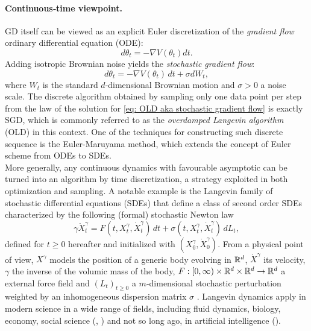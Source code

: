 \documentclass[12pt]{article}
\begin{document}
\paragraph{Continuous‐time viewpoint.}
GD itself can be viewed as an explicit Euler discretization of the \emph{gradient flow} ordinary differential equation (ODE):
\begin{equation*}
d\theta_t=-\nabla V(\theta_t)dt.
\end{equation*}
Adding isotropic Brownian noise yields the \emph{stochastic gradient flow}:
\begin{equation}
\label{eq: OLD aka stochastic gradient flow}
\boxed{
d\theta_t=-\nabla V(\theta_t)\,dt+\sigma dW_t,
}
\end{equation}
where \(W_t\) is the standard \(d\)-dimensional Brownian motion and \(\sigma>0\) a noise scale.
The discrete algorithm obtained by sampling only one data point per step from the law of the solution for \eqref{eq: OLD aka stochastic gradient flow} is exactly SGD, which is commonly referred to as the \textit{overdamped Langevin algorithm} (OLD) in this context.
One of the techniques for constructing such discrete sequence is the Euler-Maruyama method, which extends the concept of Euler scheme from ODEs to SDEs. \\

More generally, any continuous dynamics with favourable asymptotic can be turned into an algorithm by time discretization, a strategy exploited in both optimization and sampling.
A notable example is the Langevin family of stochastic differential equations (SDEs) that define a class of second order SDEs characterized by the following (formal) stochastic Newton law
\[
\gamma \ddot{X}_t^{\gamma} = F(t, X_t^{\gamma}, \dot{X}_t^{\gamma})\,dt + \sigma(t, X_t^{\gamma}, \dot{X}_t^{\gamma})\,dL_t,
\]
defined for $t\ge 0$ hereafter and initialized with $(X_0^\gamma, \dot{X}_0^\gamma)$.
From a physical point of view, $X^{\gamma}$ models the position of a generic body evolving in ${\mathbb{R}}^d$, $\dot{X}^{\gamma}$ its velocity, $\gamma$ the inverse of the volumic mass of the body, $F : [0, \infty) \times {\mathbb{R}}^d \times {\mathbb{R}}^d \to {\mathbb{R}}^d$ a external force field and $(L_t)_{t \ge 0}$ a $m$-dimensional stochastic perturbation weighted by an inhomogeneous dispersion matrix $\sigma$ \cite{l08}.
Langevin dynamics apply in modern science in a wide range of fields, including fluid dynamics, biology, economy, social science (\cite{pt13}, \cite{npt10}) and not so long ago, in artificial intelligence (\cite{ccb18}).
\end{document}
